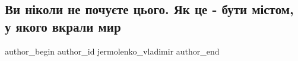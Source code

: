  
 
 
 
 

\subsection{Ви ніколи не почуєте цього. Як це - бути містом, у якого вкрали мир}
\label{sec:16_01_2023.fb.jermolenko_vladimir.1.vi_n_koli_ne_pochu_t}

\ifcmt
 author_begin
   author_id jermolenko_vladimir
 author_end
\fi

